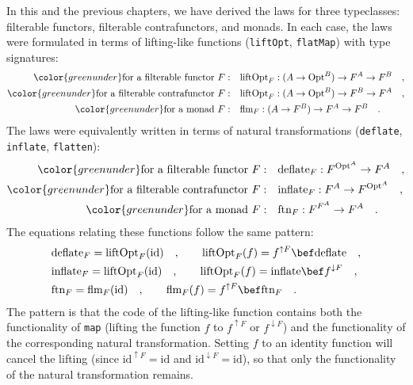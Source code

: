 In this and the previous chapters, we have derived the laws for three
typeclasses: filterable functors, filterable contrafunctors, and monads.
In each case, the laws were formulated in terms of lifting-like functions
(\lstinline!liftOpt!, \lstinline!flatMap!) with type signatures:
\begin{align*}
{\color{greenunder}\text{for a filterable functor }F:}\quad & \text{liftOpt}_{F}:(A\rightarrow\text{Opt}^{B})\rightarrow F^{A}\rightarrow F^{B}\quad,\\
{\color{greenunder}\text{for a filterable contrafunctor }F:}\quad & \text{liftOpt}_{F}:(A\rightarrow\text{Opt}^{B})\rightarrow F^{B}\rightarrow F^{A}\quad,\\
{\color{greenunder}\text{for a monad }F:}\quad & \text{flm}_{F}:(A\rightarrow F^{B})\rightarrow F^{A}\rightarrow F^{B}\quad.
\end{align*}
The laws were equivalently written in terms of natural transformations
(\lstinline!deflate!, \lstinline!inflate!, \lstinline!flatten!):
\begin{align*}
{\color{greenunder}\text{for a filterable functor }F:}\quad & \text{deflate}_{F}:F^{\text{Opt}^{A}}\rightarrow F^{A}\quad,\\
{\color{greenunder}\text{for a filterable contrafunctor }F:}\quad & \text{inflate}_{F}:F^{A}\rightarrow F^{\text{Opt}^{A}}\quad,\\
{\color{greenunder}\text{for a monad }F:}\quad & \text{ftn}_{F}:F^{F^{A}}\rightarrow F^{A}\quad.
\end{align*}
The equations relating these functions follow the same pattern:
\begin{align*}
 & \text{deflate}_{F}=\text{liftOpt}_{F}(\text{id})\quad,\quad\quad\text{liftOpt}_{F}(f)=f^{\uparrow F}\bef\text{deflate}\quad,\\
 & \text{inflate}_{F}=\text{liftOpt}_{F}(\text{id})\quad,\quad\quad\text{liftOpt}_{F}(f)=\text{inflate}\bef f^{\downarrow F}\quad,\\
 & \text{ftn}_{F}=\text{flm}_{F}(\text{id})\quad,\quad\quad\text{flm}_{F}(f)=f^{\uparrow F}\bef\text{ftn}_{F}\quad.
\end{align*}
The pattern is that the code of the lifting-like function contains
both the functionality of \lstinline!map! (lifting the function $f$
to $f^{\uparrow F}$ or $f^{\downarrow F}$) and the functionality
of the corresponding natural transformation. Setting $f$ to an identity
function will cancel the lifting (since $\text{id}^{\uparrow F}=\text{id}$
and $\text{id}^{\downarrow F}=\text{id}$), so that only the functionality
of the natural transformation remains.

